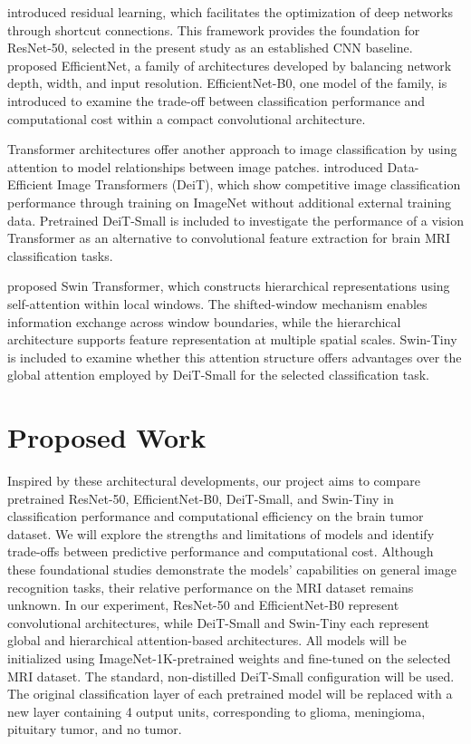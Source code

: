\documentclass{article}
\begin{document}
\citet{he2016} introduced residual learning,
which facilitates the optimization of deep networks through shortcut connections. This framework provides the foundation for ResNet-50,
selected in the present study as an established CNN baseline. \citet{tan2019} proposed EfficientNet, a family of architectures developed by
balancing network depth, width, and input resolution. EfficientNet-B0, one model of the family, is introduced to examine the trade-off between 
classification performance and computational cost within a compact convolutional architecture.

Transformer architectures offer another approach to image classification by using attention to model relationships between image patches.
\citet{touvron2021} introduced Data-Efficient Image Transformers (DeiT), which show competitive image classification performance through
training on ImageNet without additional external training data. Pretrained DeiT-Small is included to investigate the performance of a vision
Transformer as an alternative to convolutional feature extraction for brain MRI classification tasks.

\citet{liu2021} proposed Swin Transformer, which constructs hierarchical representations using self-attention within local windows.
The shifted-window mechanism enables information exchange across window boundaries, while the hierarchical architecture supports feature
representation at multiple spatial scales. Swin-Tiny is included to examine whether this attention structure offers advantages over the global
attention employed by DeiT-Small for the selected classification task.

\section*{Proposed Work}
\setlength{\emergencystretch}{2em}
Inspired by these architectural developments, our project aims to compare pretrained ResNet-50, \mbox{EfficientNet-B0}, DeiT-Small, and Swin-Tiny
in classification performance and computational efficiency on the brain tumor dataset. We will explore the strengths and limitations of
models and identify trade-offs between predictive performance and computational cost. Although these foundational studies demonstrate
the models' capabilities on general image recognition tasks, their relative performance on the MRI dataset remains unknown. In our
experiment, ResNet-50 and EfficientNet-B0 represent convolutional architectures, while DeiT-Small and Swin-Tiny each represent global and
hierarchical attention-based architectures. All models will be initialized using ImageNet-1K-pretrained weights and fine-tuned on the
selected MRI dataset. The standard, non-distilled DeiT-Small configuration will be used. The original classification layer of each pretrained
model will be replaced with a new layer containing 4 output units, corresponding to glioma, meningioma, pituitary tumor, and no tumor.
\end{document}
